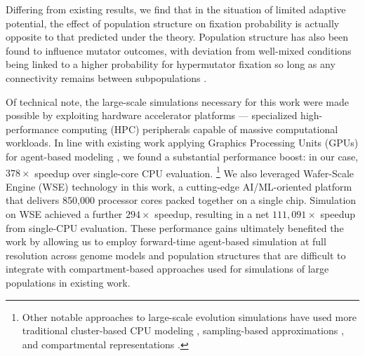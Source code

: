 Differing from existing results, we find that in the situation of limited adaptive potential, the effect of population structure on fixation probability is actually opposite to that predicted under the theory.
Population structure has also been found to influence mutator outcomes, with deviation from well-mixed conditions being linked to a higher probability for hypermutator fixation so long as any connectivity remains between subpopulations \citep{raynes2019migration}.

Of technical note, the large-scale simulations necessary for this work were made possible by exploiting hardware accelerator platforms --- specialized high-performance computing (HPC) peripherals capable of massive computational workloads.
In line with existing work applying Graphics Processing Units (GPUs) for agent-based modeling \citep{turpin2021xaevol,kosiachenko2019mass,perumalla2009switching,heinemann2007artificial,richmond2023flame}, we found a substantial performance boost: in our case, $378\times$ speedup over single-core CPU evaluation.
\footnote{%
Other notable approaches to large-scale evolution simulations have used more traditional cluster-based CPU modeling \citep{moreno2022best,collier2015large,ray1995proposal,turpin2020paevol}, sampling-based approximations \citep{taddei1997role}, and compartmental representations \citep{tenaillon1999mutators}.}
We also leveraged Wafer-Scale Engine (WSE) technology in this work, a cutting-edge AI/ML-oriented platform that delivers 850,000 processor cores packed together on a single chip.
Simulation on WSE achieved a further $294\times$ speedup, resulting in a net $111{,}091\times$ speedup from single-CPU evaluation.
These performance gains ultimately benefited the work by allowing us to employ forward-time agent-based simulation at full resolution across genome models and population structures that are difficult to integrate with compartment-based approaches used for simulations of large populations in existing work.
